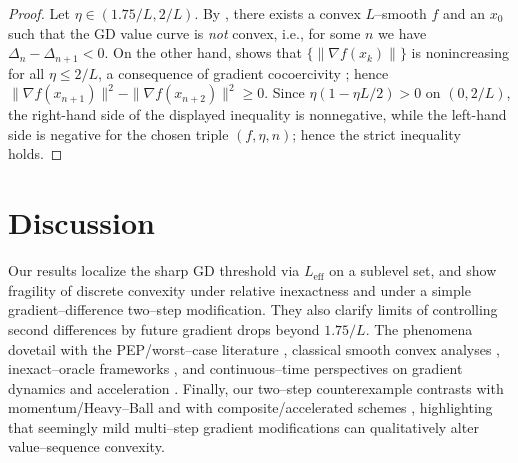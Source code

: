\documentclass[11pt]{article}
\theoremstyle{plain}
\theoremstyle{remark}
\begin{document}
\begin{proof}
Let $\eta\in(1.75/L,2/L)$. By \cite[Thm.~1]{BarzilaiShamirZamani2025}, there exists a convex $L$--smooth $f$ and an $x_0$ such that the GD value curve is \emph{not} convex, i.e., for some $n$ we have $\Delta_n-\Delta_{n+1}<0$. On the other hand, \cite[Thm.~3]{BarzilaiShamirZamani2025} shows that $\{\|\nabla f(x_k)\|\}$ is nonincreasing for all $\eta\le 2/L$, a consequence of gradient cocoercivity \cite{BaillonHaddad1977}; hence $\|\nabla f(x_{n+1})\|^2-\|\nabla f(x_{n+2})\|^2\ge0$. Since $\eta(1-\eta L/2)>0$ on $(0,2/L)$, the right-hand side of the displayed inequality is nonnegative, while the left-hand side is negative for the chosen triple $(f,\eta,n)$; hence the strict inequality holds.
\end{proof}

\section{Discussion}
Our results localize the sharp GD threshold via $L_{\mathrm{eff}}$ on a sublevel set, and show fragility of discrete convexity under relative inexactness and under a simple gradient--difference two--step modification. They also clarify limits of controlling second differences by future gradient drops beyond $1.75/L$. The phenomena dovetail with the PEP/worst--case literature \cite{DroriTeboulle2014,TaylorHendrickxGlineur2017}, classical smooth convex analyses \cite{Nesterov2004,Bubeck2015,Nesterov2018}, inexact--oracle frameworks \cite{DevolderGlineurNesterov2014,DaspremontJaggi2013}, and continuous--time perspectives on gradient dynamics and acceleration \cite{SuBoydCandes2016,AttouchPeypouquet2016}. Finally, our two--step counterexample contrasts with momentum/Heavy--Ball \cite{Polyak1964} and with composite/accelerated schemes \cite{Nesterov2013}, highlighting that seemingly mild multi--step gradient modifications can qualitatively alter value--sequence convexity.
\end{document}
